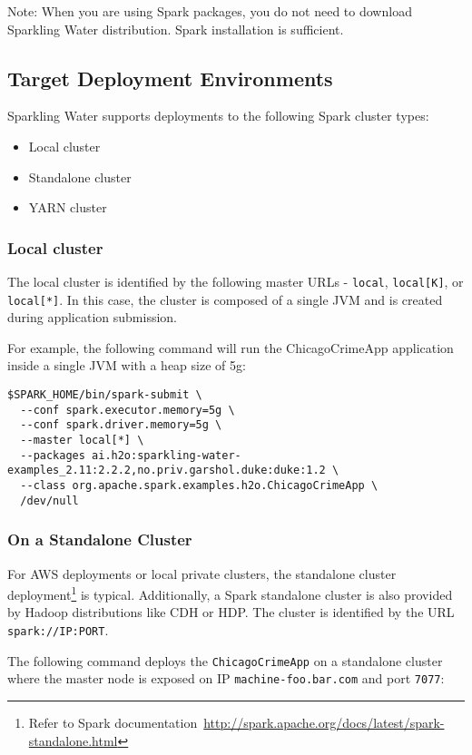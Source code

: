 Note: When you are using Spark packages, you do not need to download Sparkling Water distribution. Spark installation is sufficient.

\subsection{Target Deployment Environments}
Sparkling Water supports deployments to the following Spark cluster types:
\begin{itemize}
	\item{Local cluster}
	\item{Standalone cluster} 
	\item{YARN cluster}
\end{itemize}

\subsubsection{Local cluster}
The local cluster is identified by the following master URLs - \texttt{local}, \texttt{local[K]}, or \texttt{local[*]}. In this case, the cluster is composed of a single JVM and is created during application submission.

For example, the following command will run the ChicagoCrimeApp application inside a single JVM with a heap size of 5g:
\begin{lstlisting}[style=Bash]
$SPARK_HOME/bin/spark-submit \ 
  --conf spark.executor.memory=5g \
  --conf spark.driver.memory=5g \
  --master local[*] \
  --packages ai.h2o:sparkling-water-examples_2.11:2.2.2,no.priv.garshol.duke:duke:1.2 \
  --class org.apache.spark.examples.h2o.ChicagoCrimeApp \
  /dev/null
\end{lstlisting}

\subsubsection{On a Standalone Cluster}
For AWS deployments or local private clusters, the standalone cluster deployment\footnote{Refer to Spark documentation~\url{http://spark.apache.org/docs/latest/spark-standalone.html}} is typical. Additionally, a Spark standalone cluster is also provided by Hadoop distributions like CDH or HDP. The cluster is identified by the URL \texttt{spark://IP:PORT}.

The following command deploys the \texttt{ChicagoCrimeApp} on a standalone cluster where the master node is exposed on IP \texttt{machine-foo.bar.com} and port \texttt{7077}:

